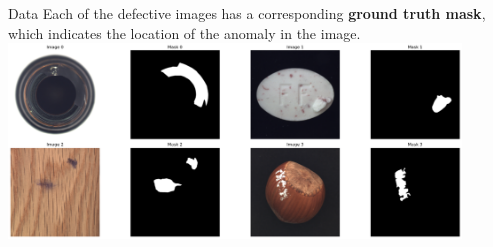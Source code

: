 \documentclass{beamer}
\begin{document}
\begin{frame}{Data}
      Each of the defective images has a corresponding \textbf{ground truth mask},
       which indicates the location of the anomaly in the image.\\
            \center
       \includegraphics[width=0.9\textwidth]
            {assets/masks}
\end{frame}
\end{document}
